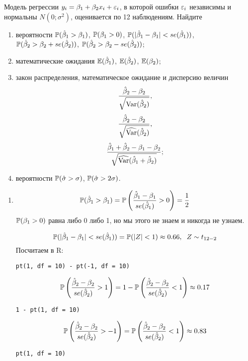 \begin{problem}
Модель регрессии $y_i = \beta_1 + \beta_2 x_i + \e_i$, в которой ошибки
$\e_i$ независимы и нормальны $N(0;\sigma^2)$, оценивается по 12 наблюдениям. Найдите
\begin{enumerate}
\item вероятности $\P(\hb_1>\beta_1)$, $\P(\beta_1>0)$, $\P(|\hb_1-\beta_1|<se(\hb_1))$, $\P(\hb_2>\beta_2+se(\hb_2))$, $\P(\hb_2>\beta_2-se(\hb_2))$;
\item математические ожидания $\E(\hb_1)$, $\E(\hb_2)$, $\E(\beta_2)$;
\item закон распределения, математическое ожидание и дисперсию величин
\[
\frac{\hb_2-\beta_2}{\sqrt{\Var(\hb_2)}},
\]
\[
\frac{\hb_2-\beta_2}{\sqrt{\hVar(\hb_2)}},
\]
\[
\frac{\hb_1+\hb_2-\beta_1-\beta_2}{\sqrt{\hVar(\hb_1+\hb_2)}};
\]
\item вероятности $\P(\hs>\sigma)$, $\P(\hs>2\sigma)$.
\end{enumerate}



\begin{sol}

\begin{enumerate}
\item
\[
\P(\hb_1>\beta_1) = \P\left(\frac{\hb_1 - \beta_1}{se(\hb_1)}>0\right) = \frac{1}{2}
\]
$\P(\beta_1>0)$ равна либо 0 либо 1, но мы этого не знаем и никогда не узнаем.

\[
\P(|\hb_1-\beta_1|<se(\hb_1)) = \P(|Z|<1) \approx 0.66, \hspace{2mm}Z \sim t_{12-2}
\]
Посчитаем в R:
\begin{verbatim}
pt(1, df = 10) - pt(-1, df = 10)
\end{verbatim}

\[
\P\left(\frac{\hb_2-\beta_2}{se(\hb_2)} > 1\right) = 1 - \P\left(\frac{\hb_2-\beta_2}{se(\hb_2)} < 1\right) \approx 0.17
\]

\begin{verbatim}
1 - pt(1, df = 10)
\end{verbatim}

\[
\P\left(\frac{\hb_2-\beta_2}{se(\hb_2)} > -1\right) = \P\left(\frac{\hb_2-\beta_2}{se(\hb_2)} < 1\right) \approx 0.83
\]

\begin{verbatim}
pt(1, df = 10)
\end{verbatim}


\end{enumerate}
\end{sol}
\end{problem}
